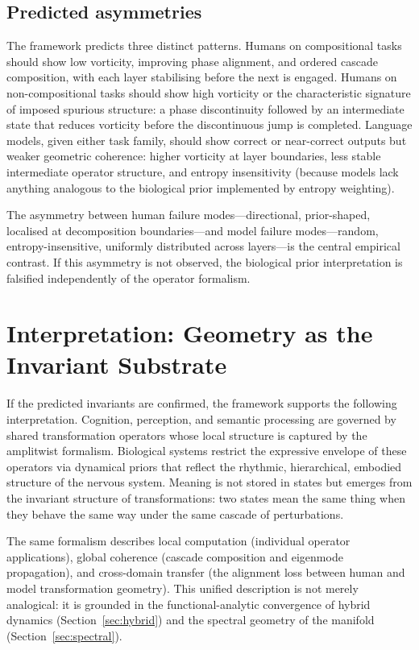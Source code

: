 \documentclass[12pt, a4paper]{article}
\theoremstyle{remark}
\theoremstyle{definition}
\begin{document}
\subsection{Predicted asymmetries}

The framework predicts three distinct patterns.  Humans on compositional tasks should show
low vorticity, improving phase alignment, and ordered cascade composition, with each layer
stabilising before the next is engaged.  Humans on non-compositional tasks should show
high vorticity or the characteristic signature of imposed spurious structure: a phase
discontinuity followed by an intermediate state that reduces vorticity before the
discontinuous jump is completed.  Language models, given either task family, should show
correct or near-correct outputs but weaker geometric coherence: higher vorticity at layer
boundaries, less stable intermediate operator structure, and entropy insensitivity (because
models lack anything analogous to the biological prior implemented by entropy weighting).

The asymmetry between human failure modes---directional, prior-shaped, localised at
decomposition boundaries---and model failure modes---random, entropy-insensitive, uniformly
distributed across layers---is the central empirical contrast.  If this asymmetry is not
observed, the biological prior interpretation is falsified independently of the operator
formalism.

\section{Interpretation: Geometry as the Invariant Substrate}
\label{sec:interpretation}

If the predicted invariants are confirmed, the framework supports the following
interpretation.  Cognition, perception, and semantic processing are governed by shared
transformation operators whose local structure is captured by the amplitwist formalism.
Biological systems restrict the expressive envelope of these operators via dynamical priors
that reflect the rhythmic, hierarchical, embodied structure of the nervous system.  Meaning
is not stored in states but emerges from the invariant structure of transformations: two
states mean the same thing when they behave the same way under the same cascade of
perturbations.

The same formalism describes local computation (individual operator applications), global
coherence (cascade composition and eigenmode propagation), and cross-domain transfer (the
alignment loss between human and model transformation geometry).  This unified description
is not merely analogical: it is grounded in the functional-analytic convergence of hybrid
dynamics (Section~\ref{sec:hybrid}) and the spectral geometry of the manifold
(Section~\ref{sec:spectral}).
\end{document}
